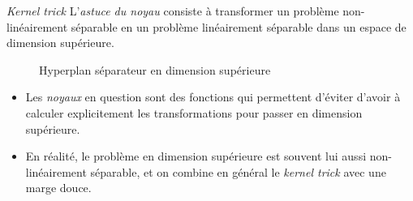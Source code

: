 \documentclass[../allslides.tex]{subfiles}
\begin{document}
\begin{frame}[fragile]{\emph{Kernel trick}}
    L'\emph{astuce du noyau} consiste à transformer un problème non-linéairement séparable en un problème linéairement séparable dans un espace de dimension supérieure.

    \begin{figure}
        \tikzset{external/export=true}
        \caption{Hyperplan séparateur en dimension supérieure}
    \end{figure}
    \vspace{-1\bigskipamount}
    \begin{overprint}
            \begin{itemize}
                \item Les \emph{noyaux} en question sont des fonctions qui permettent d'éviter d'avoir à calculer explicitement les transformations pour passer en dimension supérieure.
            \end{itemize}
            \begin{itemize}
                \item En réalité, le problème en dimension supérieure est souvent lui aussi non-linéairement séparable, et on combine en général le \emph{kernel trick} avec une marge douce.
            \end{itemize}
    \end{overprint}
\end{frame}
\end{document}
